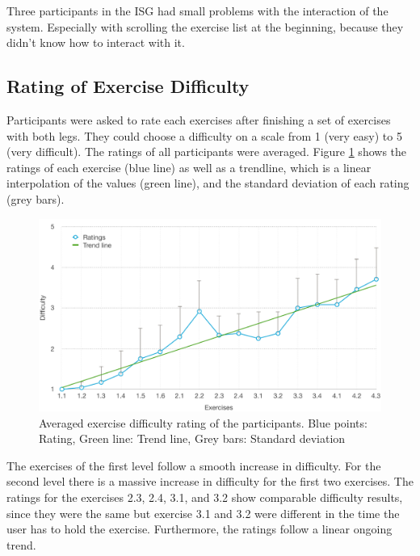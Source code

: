 Three participants in the ISG had small problems with the interaction of the system.
Especially with scrolling the exercise list at the beginning, because they didn't know how to interact with it.

\subsection{Rating of Exercise Difficulty}
Participants were asked to rate each exercises after finishing a set of exercises with both legs.
They could choose a difficulty on a scale from 1 (very easy) to 5 (very difficult).
The ratings of all participants were averaged.
Figure \ref{fig:6_4_exerciseDifficulty} shows the ratings of each exercise (blue line) as well as a trendline, which is a linear interpolation of the values (green line), and the standard deviation of each rating (grey bars).

\begin{figure}[htb]
	\centering
	\begin{minipage}[t]{1\linewidth}
		\centering
		\includegraphics[width=1\linewidth]{Pictures/6_4_DIA_ExerciseDifficulty2}
		\caption{Averaged exercise difficulty rating of the participants. Blue points: Rating, Green line: Trend line, Grey bars: Standard deviation}
		\label{fig:6_4_exerciseDifficulty}
	\end{minipage}
\end{figure}

The exercises of the first level follow a smooth increase in difficulty.
For the second level there is a massive increase in difficulty for the first two exercises.
The ratings for the exercises 2.3, 2.4, 3.1, and 3.2 show comparable difficulty results, since they were the same but exercise 3.1 and 3.2 were different in the time the user has to hold the exercise.
Furthermore, the ratings follow a linear ongoing trend.

